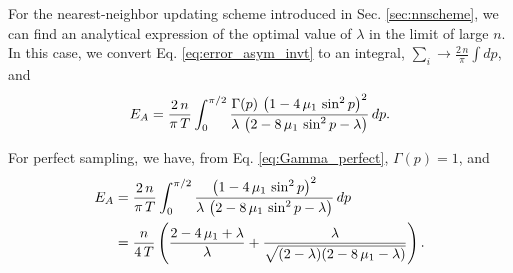 \documentclass[reprint, floatfix]{revtex4-1}
\newcommand{\Err}{E}
\begin{document}
For the nearest-neighbor updating scheme
introduced in Sec. \ref{sec:nnscheme},
we can find an analytical expression
of the optimal value of $\lambda$
in the limit of large $n$.
%
In this case,
we convert Eq.
\eqref{eq:error_asym_invt}
to an integral,
$\sum_i \to \frac{2 \, n}{\pi} \int dp$, and
%
\begin{align}
\Err_A
=
\frac{2 \, n}{\pi \, T}
\int_0^{\pi/2}
  \frac{ \Gamma(p) \, \left(1 - 4 \, \mu_1 \, \sin^2 p \right)^2    }
       {   \lambda \, \left(2 - 8 \, \mu_1 \, \sin^2 p - \lambda \right) }
\, dp.
\notag
\end{align}



For perfect sampling,
we have, from Eq. \eqref{eq:Gamma_perfect},
$\Gamma(p) = 1$, and
$$
\begin{aligned}
\Err_A
&=
\frac{2 \, n}{\pi \, T}
\int_0^{\pi/2}
\frac{ \left(1 - 4 \, \mu_1 \, \sin^2 p \right)^2 }
{ \lambda \, \left(2 - 8 \, \mu_1 \, \sin^2 p - \lambda \right) }
\, dp
\notag \\
&=
\frac{n}{4 \, T}
\left(
  \frac{2 - 4 \, \mu_1 + \lambda}{ \lambda }
  +
  \frac{ \lambda }
  { \sqrt{ (2 - \lambda) (2 - 8 \, \mu_1 - \lambda) } }
\right).
\end{aligned}
$$
\end{document}
